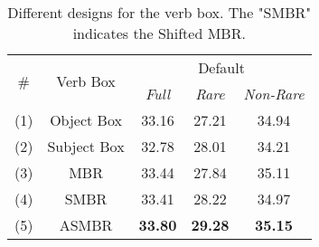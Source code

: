 \documentclass[10pt,twocolumn,letterpaper]{article}
\begin{document}
\begin{table*}[!t]
\begin{minipage}{0.34\linewidth}
{\begin{tabular}{@{}ccccc@{}}
                \hline
                \multicolumn{1}{c|}{\multirow{2}{*}{\#}} & \multicolumn{1}{c|}{\multirow{2}{*}{Verb Box}} & \multicolumn{3}{c}{Default}  \\
                \multicolumn{1}{c|}{}                    & \multicolumn{1}{c|}{}                          & \textit{Full} & \textit{Rare} & \textit{Non-Rare} \\ \hline \hline
                \multicolumn{1}{c|}{(1)}                 & \multicolumn{1}{c|}{Object Box}                & 33.16  & 27.21  & 34.94    \\
                \multicolumn{1}{c|}{(2)}                 & \multicolumn{1}{c|}{Subject Box}               & 32.78  & 28.01  & 34.21    \\
                \multicolumn{1}{c|}{(3)}                 & \multicolumn{1}{c|}{MBR}                       & 33.44  & 27.84  & 35.11    \\ 
                \multicolumn{1}{c|}{(4)}                 & \multicolumn{1}{c|}{SMBR}                      & 33.41  & 28.22  & 34.97    \\ 
                \multicolumn{1}{c|}{(5)}                 & \multicolumn{1}{c|}{ASMBR}                     & \textbf{33.80}  & \textbf{29.28}  & \textbf{35.15} \\ \hline
            \end{tabular}
        }
        \caption{Different designs for the verb box. The "SMBR" indicates the Shifted MBR.}
        \label{tab:tab4}
        \vspace{4.3mm}
        \renewcommand\thetable{6}
\end{minipage}
\end{table*}
\end{document}
